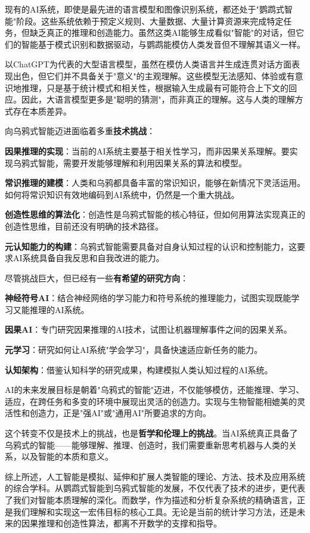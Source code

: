 现有的AI系统，即使是最先进的语言模型和图像识别系统，都还处于"鹦鹉式智能"阶段。这些系统依赖于预定义规则、大量数据、大量计算资源来完成特定任务，但缺乏真正的推理和创造能力。虽然这类AI能够生成看似"智能"的对话，但它们的智能基于模式识别和数据驱动，与鹦鹉能模仿人类发音但不理解其语义一样。

以ChatGPT为代表的大型语言模型，虽然在模仿人类语言并生成连贯对话方面表现出色，但它们并不具备关于"意义"的主观理解。这些模型无法感知、体验或有意识地推理，只是基于统计模式和相关性，根据输入生成最有可能符合上下文的回应。因此，大语言模型更多是"聪明的猜测"，而非真正的理解。这与人类的理解方式存在本质差异。

向乌鸦式智能迈进面临着多重\textbf{技术挑战}：

\textbf{因果推理的实现}：当前的AI系统主要基于相关性学习，而非因果关系理解。要实现乌鸦式智能，需要开发能够理解和利用因果关系的算法和模型。

\textbf{常识推理的建模}：人类和乌鸦都具备丰富的常识知识，能够在新情况下灵活运用。如何将常识知识有效地编码到AI系统中，仍然是一个重大挑战。

\textbf{创造性思维的算法化}：创造性是乌鸦式智能的核心特征，但如何用算法实现真正的创造性思维，目前还没有明确的技术路径。

\textbf{元认知能力的构建}：乌鸦式智能需要具备对自身认知过程的认识和控制能力，这要求AI系统具备自我反思和自我改进的能力。

尽管挑战巨大，但已经有一些\textbf{有希望的研究方向}：

\textbf{神经符号AI}：结合神经网络的学习能力和符号系统的推理能力，试图实现既能学习又能推理的AI系统。

\textbf{因果AI}：专门研究因果推理的AI技术，试图让机器理解事件之间的因果关系。

\textbf{元学习}：研究如何让AI系统"学会学习"，具备快速适应新任务的能力。

\textbf{认知架构}：借鉴认知科学的研究成果，构建模拟人类认知过程的AI系统。

AI的未来发展目标是朝着"乌鸦式的智能"迈进，不仅能够模仿，还能推理、学习、适应，在跨任务和多变的环境中展现出灵活的创造力。实现与生物智能相媲美的灵活性和创造力，正是"强AI"或"通用AI"所要追求的方向。

这个转变不仅是技术上的挑战，也是\textbf{哲学和伦理上的挑战}。当AI系统真正具备了乌鸦式的智能——能够理解、推理、创造时，我们需要重新思考机器与人类的关系，以及智能的本质和意义。

综上所述，人工智能是模拟、延伸和扩展人类智能的理论、方法、技术及应用系统的综合学科。从鹦鹉式智能到乌鸦式智能的发展，不仅代表了技术的进步，更代表了我们对智能本质理解的深化。而数学，作为描述和分析复杂系统的精确语言，正是我们理解和实现这一宏伟目标的核心工具。无论是当前的统计学习方法，还是未来的因果推理和创造性算法，都离不开数学的支撑和指导。

\nocite{*}
\newpage